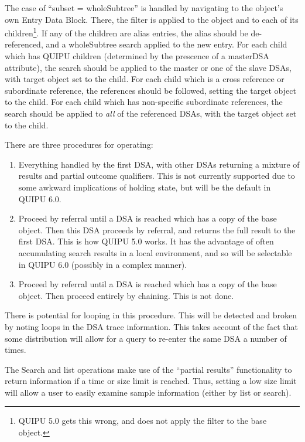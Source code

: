 The case of ``subset = wholeSubtree'' is handled by navigating to the
object's own Entry Data Block.
There, the filter is applied to the object and to each of its
children\footnote{QUIPU 5.0 gets this wrong, and does not apply the filter
to the base object.}.
If any of the children are alias entries, the alias should be
de-referenced, and a wholeSubtree search applied to the new entry.
For each child which has QUIPU children (determined
by the prescence of a masterDSA attribute), the search should be applied to
the master or one of the slave DSAs, with target object set to the child.
For each child which is a cross reference or subordinate reference, 
the references should be followed, setting the target object to the child.
For each child which has non-specific subordinate references, the search
should be applied to {\em all} of the referenced DSAs, with the target
object set to the child.

There are three procedures for operating:

\begin {enumerate}
\item Everything handled by the first DSA, with other DSAs returning a
mixture of results and partial outcome qualifiers.  This is not currently
supported due to some awkward implications of holding state, but will be the
default in QUIPU 6.0.

\item Proceed by referral until a DSA is reached which has a copy of the
base object.  Then this DSA proceeds by referral, and returns the full
result to the first DSA.  This is how QUIPU 5.0 works.  It has the advantage
of often accumulating search results in a local environment, and so will be
selectable in QUIPU 6.0 (possibly in a complex manner).

\item Proceed by referral until a DSA is reached which has a copy of the
base object.  Then proceed entirely by chaining.  This is not done.

\end {enumerate}


There is potential for looping in this procedure.
This will be detected and broken by noting loops in the DSA trace
information.
This takes account of the fact that some distribution will allow
for a query to re-enter the same DSA a number of times.


The Search and list operations make use of the ``partial results''
functionality to return information if a time or size limit is reached.
Thus, setting a low size limit will allow a user to easily examine 
sample information (either by list or search).

